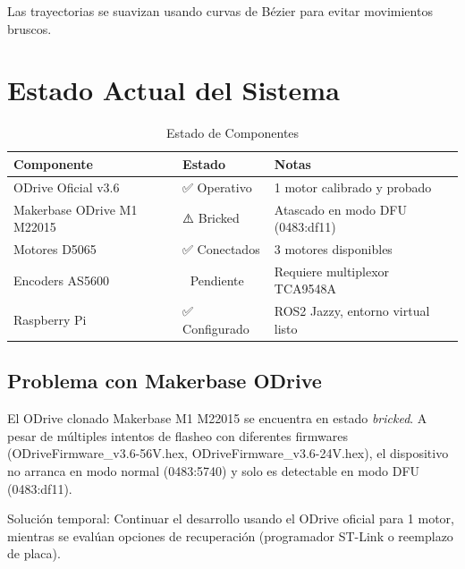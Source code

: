 Las trayectorias se suavizan usando curvas de Bézier para evitar movimientos bruscos.

\section{Estado Actual del Sistema}

\begin{table}[h]
\centering
\caption{Estado de Componentes}
\label{tab:estado_actual}
\begin{tabular}{lll}
\toprule
\textbf{Componente} & \textbf{Estado} & \textbf{Notas} \\
\midrule
ODrive Oficial v3.6 & ✅ Operativo & 1 motor calibrado y probado \\
Makerbase ODrive M1 M22015 & ⚠️ Bricked & Atascado en modo DFU (0483:df11) \\
Motores D5065 & ✅ Conectados & 3 motores disponibles \\
Encoders AS5600 & 🔌 Pendiente & Requiere multiplexor TCA9548A \\
Raspberry Pi & ✅ Configurado & ROS2 Jazzy, entorno virtual listo \\
\bottomrule
\end{tabular}
\end{table}

\subsection{Problema con Makerbase ODrive}

El ODrive clonado Makerbase M1 M22015 se encuentra en estado \textit{bricked}. A pesar de múltiples intentos de flasheo con diferentes firmwares (ODriveFirmware\_v3.6-56V.hex, ODriveFirmware\_v3.6-24V.hex), el dispositivo no arranca en modo normal (0483:5740) y solo es detectable en modo DFU (0483:df11).

Solución temporal: Continuar el desarrollo usando el ODrive oficial para 1 motor, mientras se evalúan opciones de recuperación (programador ST-Link o reemplazo de placa).

